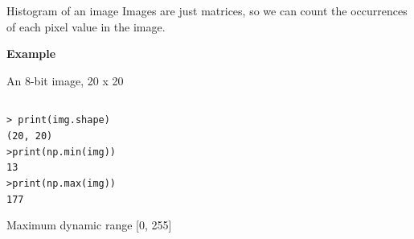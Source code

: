 \documentclass[9pt, aspectratio=169]{beamer}
\begin{document}
\begin{frame}
    {Histogram of an image}
    Images are just matrices, so we can count the occurrences of each pixel value in the image.

    \textbf{Example}

    An 8-bit image, 20 x 20

    \begin{columns}
        \begin{column}{0.5\textwidth}
            \begin{codebox}
                \texttt{> print(img.shape)\\
                    (20, 20)\\
                    >print(np.min(img))\\
                    13\\
                    >print(np.max(img))\\
                    177
                }
            \end{codebox}
            {
                Maximum dynamic range [0, 255]

}
\end{column}
\end{columns}
\end{frame}
\end{document}
